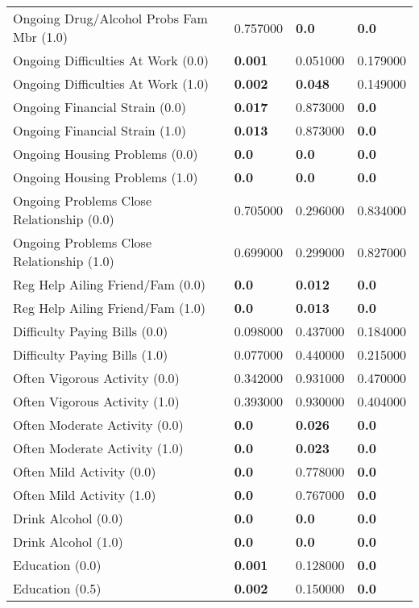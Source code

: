 \begin{tabular}{llll}
Ongoing Drug/Alcohol Probs Fam Mbr (1.0) & 0.757000 & \textbf{0.0} & \textbf{0.0} \\
Ongoing Difficulties At Work (0.0) & \textbf{0.001} & 0.051000 & 0.179000 \\
Ongoing Difficulties At Work (1.0) & \textbf{0.002} & \textbf{0.048} & 0.149000 \\
Ongoing Financial Strain (0.0) & \textbf{0.017} & 0.873000 & \textbf{0.0} \\
Ongoing Financial Strain (1.0) & \textbf{0.013} & 0.873000 & \textbf{0.0} \\
Ongoing Housing Problems (0.0) & \textbf{0.0} & \textbf{0.0} & \textbf{0.0} \\
Ongoing Housing Problems (1.0) & \textbf{0.0} & \textbf{0.0} & \textbf{0.0} \\
Ongoing Problems Close Relationship (0.0) & 0.705000 & 0.296000 & 0.834000 \\
Ongoing Problems Close Relationship (1.0) & 0.699000 & 0.299000 & 0.827000 \\
Reg Help Ailing Friend/Fam (0.0) & \textbf{0.0} & \textbf{0.012} & \textbf{0.0} \\
Reg Help Ailing Friend/Fam (1.0) & \textbf{0.0} & \textbf{0.013} & \textbf{0.0} \\
Difficulty Paying Bills (0.0) & 0.098000 & 0.437000 & 0.184000 \\
Difficulty Paying Bills (1.0) & 0.077000 & 0.440000 & 0.215000 \\
Often Vigorous Activity (0.0) & 0.342000 & 0.931000 & 0.470000 \\
Often Vigorous Activity (1.0) & 0.393000 & 0.930000 & 0.404000 \\
Often Moderate Activity (0.0) & \textbf{0.0} & \textbf{0.026} & \textbf{0.0} \\
Often Moderate Activity (1.0) & \textbf{0.0} & \textbf{0.023} & \textbf{0.0} \\
Often Mild Activity (0.0) & \textbf{0.0} & 0.778000 & \textbf{0.0} \\
Often Mild Activity (1.0) & \textbf{0.0} & 0.767000 & \textbf{0.0} \\
Drink Alcohol (0.0) & \textbf{0.0} & \textbf{0.0} & \textbf{0.0} \\
Drink Alcohol (1.0) & \textbf{0.0} & \textbf{0.0} & \textbf{0.0} \\
Education (0.0) & \textbf{0.001} & 0.128000 & \textbf{0.0} \\
Education (0.5) & \textbf{0.002} & 0.150000 & \textbf{0.0} \\

\end{tabular}
